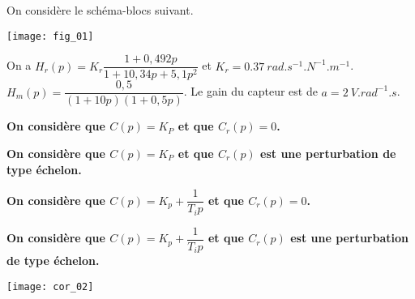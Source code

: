\ifprof
\else
\begin{multicols}{2}
\fi

\setcounter{numques}{0}
On considère le schéma-blocs suivant. 
\begin{center}
\texttt{[image: fig\_01]}
\end{center}


On a $H_r(p)=K_r \dfrac{1+0,492 p}{1+10,34p+5,1p^2}$ et $K_r = \SI{0,37}{rad.s^{-1}.N^{-1}.m^{-1}}$.
$H_m(p)=\dfrac{0,5}{\left(1+10p \right)\left(1+0,5p \right)}$. Le gain du capteur est de $a=\SI{2}{V.rad^{-1}.s}$.

\textbf{On considère que $C(p)=K_P$ et que $C_r(p)=0$.}



\textbf{On considère que $C(p)=K_P$ et que $C_r(p)$ est une perturbation de type échelon.}


\textbf{On considère que $C(p)=K_p+\dfrac{1}{T_i p} $ et que $C_r(p)=0$.}


\textbf{On considère que $C(p)=K_p+\dfrac{1}{T_i p} $ et que $C_r(p)$ est une perturbation de type échelon.}


\ifprof
\else
\end{multicols}
\fi



\ifprof
\else

\fi


\ifprof
\begin{center}
\texttt{[image: cor\_02]}
\end{center}

\else
\fi



